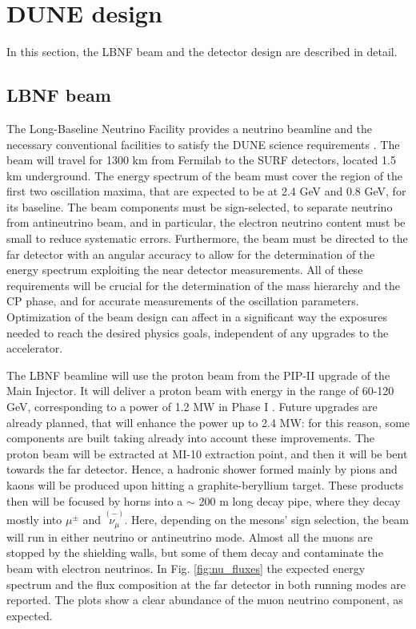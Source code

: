 \section{DUNE design}
In this section, the LBNF beam and the detector design are described in detail.
\subsection{LBNF beam}
The Long-Baseline Neutrino Facility provides a neutrino beamline and the necessary conventional facilities to satisfy the DUNE science requirements \cite{dunelbnf_cdrvol2}. The beam will travel for 1300 km from Fermilab to the SURF detectors, located 1.5 km underground.
The energy spectrum of the beam must cover the region of the first two oscillation maxima, that are expected to be at 2.4 GeV and 0.8 GeV, for its baseline. The beam components must be sign-selected, to separate neutrino from antineutrino beam, and in particular, the electron neutrino content must be small to reduce systematic errors.
Furthermore, the beam must be directed to the far detector with an angular accuracy to allow for the determination of the energy spectrum exploiting the near detector measurements. All of these requirements will be crucial for the determination of the mass hierarchy and the CP phase, and for accurate measurements of the oscillation parameters. Optimization of the beam design can affect in a significant way the exposures needed to reach the desired physics goals, independent of any upgrades to the accelerator.

The LBNF beamline will use the proton beam from the PIP-II upgrade of the Main Injector. It will deliver a proton beam with energy in the range of 60-120 GeV, corresponding to a power of 1.2 MW in Phase I \cite{dunelbnf_cdrvol1}. Future upgrades are already planned, that will enhance the power up to 2.4 MW: for this reason, some components are built taking already into account these improvements.
The proton beam will be extracted at MI-10 extraction point, and then it will be bent towards the far detector. Hence, a hadronic shower formed mainly by pions and kaons will be produced upon hitting a graphite-beryllium target. These products then will be focused by horns into a $\sim$ 200 m long decay pipe, where they decay mostly into $\mu^{\pm}$ and $\overset{(-)}{\nu_{\mu}}$.
Here, depending on the mesons' sign selection, the beam will run in either neutrino or antineutrino mode. Almost all the muons are stopped by the shielding walls, but some of them decay and contaminate the beam with electron neutrinos.
In Fig. \ref{fig:nu_fluxes} the expected energy spectrum and the flux composition at the far detector in both running modes are reported. The plots show a clear abundance of the muon neutrino component, as expected.

